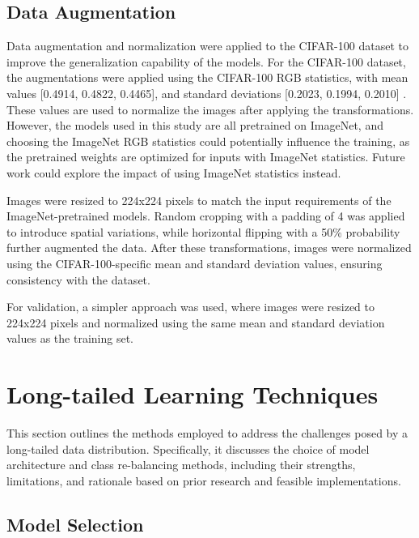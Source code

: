 \subsection{Data Augmentation}
Data augmentation and normalization were applied to the CIFAR-100 dataset to improve the generalization capability of the models. For the CIFAR-100 dataset, the augmentations were applied using the CIFAR-100 RGB statistics, with mean values [0.4914, 0.4822, 0.4465], and standard deviations [0.2023, 0.1994, 0.2010] \cite{kaidic_ldam_drw}. These values are used to normalize the images after applying the transformations. However, the models used in this study are all pretrained on ImageNet, and choosing the ImageNet RGB statistics could potentially influence the training, as the pretrained weights are optimized for inputs with ImageNet statistics. Future work could explore the impact of using ImageNet statistics instead.

Images were resized to 224x224 pixels to match the input requirements of the ImageNet-pretrained models. Random cropping with a padding of 4 was applied to introduce spatial variations, while horizontal flipping with a 50\% probability further augmented the data. After these transformations, images were normalized using the CIFAR-100-specific mean and standard deviation values, ensuring consistency with the dataset.

For validation, a simpler approach was used, where images were resized to 224x224 pixels and normalized using the same mean and standard deviation values as the training set.

\section{Long-tailed Learning Techniques}
This section outlines the methods employed to address the challenges posed by a long-tailed data distribution. Specifically, it discusses the choice of model architecture and class re-balancing methods, including their strengths, limitations, and rationale based on prior research and feasible implementations.  

\subsection{Model Selection}
\label{sec:model_selection}

